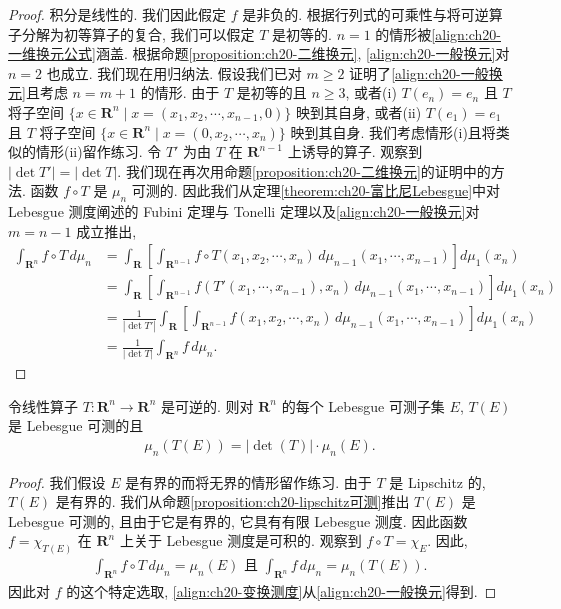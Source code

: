 \documentclass[../../main.tex]{subfiles}
\begin{document}
\begin{proof}
积分是线性的. 我们因此假定 $f$ 是非负的. 根据行列式的可乘性与将可逆算子分解为初等算子的复合, 我们可以假定 $T$ 是初等的. $n=1$ 的情形被\eqref{align:ch20-一维换元公式}涵盖. 根据命题\cref{proposition:ch20-二维换元}, \eqref{align:ch20-一般换元}对 $n=2$ 也成立. 我们现在用归纳法. 假设我们已对 $m\geqslant 2$ 证明了\eqref{align:ch20-一般换元}且考虑 $n=m+1$ 的情形. 由于 $T$ 是初等的且 $n\geqslant 3$, 或者(i) $T(e_{n})=e_{n}$ 且 $T$ 将子空间 $\{x\in\mathbf{R}^{n}\mid x=(x_{1},x_{2},\cdots,x_{n-1},0)\}$ 映到其自身, 或者(ii) $T(e_{1})=e_{1}$ 且 $T$ 将子空间 $\{x\in\mathbf{R}^{n}\mid x=(0,x_{2},\cdots,x_{n})\}$ 映到其自身. 我们考虑情形(i)且将类似的情形(ii)留作练习. 令 $T'$ 为由 $T$ 在 $\mathbf{R}^{n-1}$ 上诱导的算子. 观察到 $|\det T'|=|\det T|$. 我们现在再次用命题\cref{proposition:ch20-二维换元}的证明中的方法. 函数 $f\circ T$ 是 $\mu_{n}$ 可测的. 因此我们从定理\cref{theorem:ch20-富比尼Lebesgue}中对 Lebesgue 测度阐述的 Fubini 定理与 Tonelli 定理以及\eqref{align:ch20-一般换元}对 $m=n-1$ 成立推出,
\begin{align*}
\int_{\mathbf{R}^{n}}f\circ T\,d\mu_{n}&=\int_{\mathbf{R}}\left[\int_{\mathbf{R}^{n-1}}f\circ T(x_{1},x_{2},\cdots,x_{n})\,d\mu_{n-1}(x_{1},\cdots,x_{n-1})\right]d\mu_{1}(x_{n})\\
&=\int_{\mathbf{R}}\left[\int_{\mathbf{R}^{n-1}}f(T'(x_{1},\cdots,x_{n-1}),x_{n})\,d\mu_{n-1}(x_{1},\cdots,x_{n-1})\right]d\mu_{1}(x_{n})\\
&=\frac{1}{|\det T'|}\int_{\mathbf{R}}\left[\int_{\mathbf{R}^{n-1}}f(x_{1},x_{2},\cdots,x_{n})\,d\mu_{n-1}(x_{1},\cdots,x_{n-1})\right]d\mu_{1}(x_{n})\\
&=\frac{1}{|\det T|}\int_{\mathbf{R}^{n}}f\,d\mu_{n}.
\end{align*}
\end{proof}

\begin{corollary}\label{corollary:ch20-线性变换测度}
令线性算子 $T:\mathbf{R}^{n}\to\mathbf{R}^{n}$ 是可逆的. 则对 $\mathbf{R}^{n}$ 的每个 Lebesgue 可测子集 $E$, $T(E)$ 是 Lebesgue 可测的且
\begin{align}\label{align:ch20-变换测度}
\mu_{n}(T(E))=|\det(T)|\cdot\mu_{n}(E).
\end{align}
\end{corollary}

\begin{proof}
我们假设 $E$ 是有界的而将无界的情形留作练习. 由于 $T$ 是 Lipschitz 的, $T(E)$ 是有界的. 我们从命题\cref{proposition:ch20-lipschitz可测}推出 $T(E)$ 是 Lebesgue 可测的, 且由于它是有界的, 它具有有限 Lebesgue 测度. 因此函数 $f=\chi_{T(E)}$ 在 $\mathbf{R}^{n}$ 上关于 Lebesgue 测度是可积的. 观察到 $f\circ T=\chi_{E}$. 因此,
\begin{align*}
\int_{\mathbf{R}^{n}}f\circ T\,d\mu_{n}=\mu_{n}(E)\text{ 且 }\int_{\mathbf{R}^{n}}f\,d\mu_{n}=\mu_{n}(T(E)).
\end{align*}
因此对 $f$ 的这个特定选取, \eqref{align:ch20-变换测度}从\eqref{align:ch20-一般换元}得到.
\end{proof}
\end{document}
